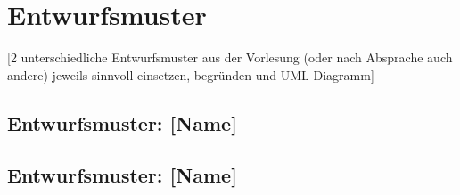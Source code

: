 \chapter{Entwurfsmuster}
[2 unterschiedliche Entwurfsmuster aus der Vorlesung (oder nach Absprache auch andere) jeweils sinnvoll einsetzen, begründen und UML-Diagramm]

\section{Entwurfsmuster:  [Name]}
\section{Entwurfsmuster:  [Name]}

